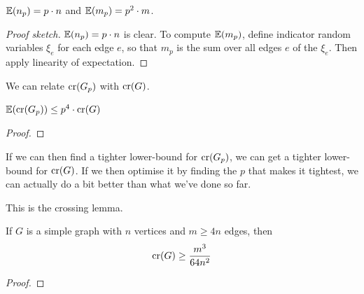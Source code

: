 \begin{boxlemma} \label{Ch7:Lemma:Gp_Expectations}
    $\mathbb{E}\!\left( n_p \right) = p \cdot n$ and $\mathbb{E}\!\left( m_p \right) = p^2 \cdot m$.
\end{boxlemma}
\begin{proof}[Proof sketch]
    $\mathbb{E}\!\left( n_p \right) = p \cdot n$ is clear. To compute $\mathbb{E}\!\left( m_p \right)$, define indicator random variables $\xi_e$ for each edge $e$, so that $m_p$ is the sum over all edges $e$ of the $\xi_e$. Then apply linearity of expectation.
\end{proof}

We can relate $\operatorname{cr}\!\left( G_p \right)$ with $\operatorname{cr}\!\left( G \right)$.

\begin{boxlemma} \label{Ch7:Lemma:Gp_Crossings}
    $\mathbb{E}\!\left( \operatorname{cr}\!\left( G_p \right) \right) \leq p^4 \cdot \operatorname{cr}\!\left( G \right)$
\end{boxlemma}
\begin{proof}
    \sorry
\end{proof}

If we can then find a tighter lower-bound for $\operatorname{cr}\!\left( G_p \right)$, we can get a tighter lower-bound for $\operatorname{cr}\!\left( G \right)$. If we then optimise it by finding the $p$ that makes it tightest, we can actually do a bit better than what we've done so far.

This is the crossing lemma.

\begin{boxtheorem} \label{Ch7:Thm:Crossing_Lemma}
    If $G$ is a simple graph with $n$ vertices and $m \geq 4n$ edges, then
    \begin{align*}
        \operatorname{cr}\!\left( G \right) \geq \frac{m^3}{64n^2}
    \end{align*}
\end{boxtheorem}
\begin{proof}
    \sorry
\end{proof}

